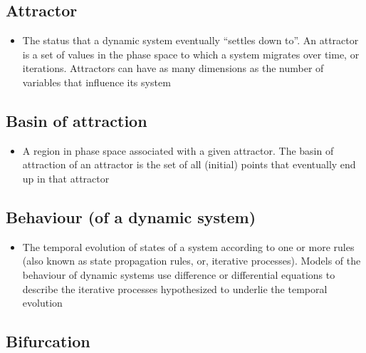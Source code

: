 \documentclass[12pt,]{book}
\providecommand{\tightlist}{%
  \setlength{\itemsep}{0pt}\setlength{\parskip}{0pt}}
\begin{document}
\hypertarget{Attr3}{%
\subsection*{\texorpdfstring{\textbf{Attractor}}{Attractor}}\label{Attr3}}

\begin{itemize}
\tightlist
\item
  The status that a dynamic system eventually ``settles down to''. An attractor is a set of values in the phase space to which a system migrates over time, or iterations. Attractors can have as many dimensions as the number of variables that influence its system
\end{itemize}

\hypertarget{Basi4}{%
\subsection*{\texorpdfstring{\textbf{Basin of attraction}}{Basin of attraction}}\label{Basi4}}

\begin{itemize}
\tightlist
\item
  A region in phase space associated with a given attractor. The basin of attraction of an attractor is the set of all (initial) points that eventually end up in that attractor
\end{itemize}

\hypertarget{Beha5}{%
\subsection*{\texorpdfstring{\textbf{Behaviour (of a dynamic system)}}{Behaviour (of a dynamic system)}}\label{Beha5}}

\begin{itemize}
\tightlist
\item
  The temporal evolution of states of a system according to one or more rules (also known as state propagation rules, or, iterative processes). Models of the behaviour of dynamic systems use difference or differential equations to describe the iterative processes hypothesized to underlie the temporal evolution
\end{itemize}

\hypertarget{Bifu6}{%
\subsection*{\texorpdfstring{\textbf{Bifurcation}}{Bifurcation}}\label{Bifu6}}
\end{document}
